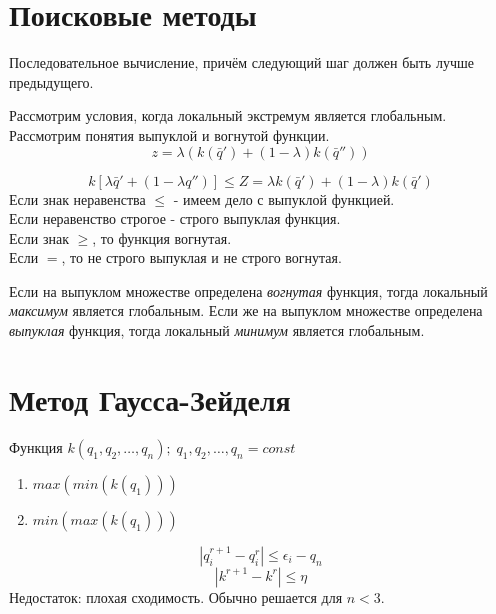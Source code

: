 \documentclass[12pt,a5paper]{scrbook}
\begin{document}
  \section{Поисковые методы}
  Последовательное вычисление, причём следующий шаг должен быть лучше предыдущего.\par
  Рассмотрим условия, когда локальный экстремум является глобальным. Рассмотрим понятия выпуклой и вогнутой функции.\\
  $$z = \lambda (k(\bar{q}') + (1-\lambda)k(\bar{q}''))$$  
  $$k[\lambda \bar{q}' + \left(1-\lambda q''\right)] \leq Z = \lambda k(\bar{q}') + (1-\lambda)k(\bar{q}')$$
  Если знак неравенства $\leq$ - имеем дело с выпуклой функцией.\\
  Если неравенство строгое - строго выпуклая функция.\\
  Если знак $\geq$, то функция вогнутая.\\
  Если $=$, то не строго выпуклая и не строго вогнутая.\par
  Если на выпуклом множестве определена \emph{вогнутая} функция, тогда локальный \emph{максимум} является глобальным. Если же на выпуклом множестве определена \emph{выпуклая} функция, тогда локальный \emph{минимум} является глобальным.
  
  \section{Метод Гаусса-Зейделя}
  Функция $k(q_1, q_2, \ldots, q_n);\;q_1, q_2, \ldots, q_n = const $
  \begin{enumerate}
    \item $max(min(k(q_1)))$ \\
    \item $min(max(k(q_1)))$ \\
  \end{enumerate}
  $$|q_i^{r+1} - q_i^r| \leq \epsilon_i - q_n$$
  $$|k^{r+1} - k^r| \leq \eta $$
  Недостаток: плохая сходимость. Обычно решается для $n<3$.
\end{document}
